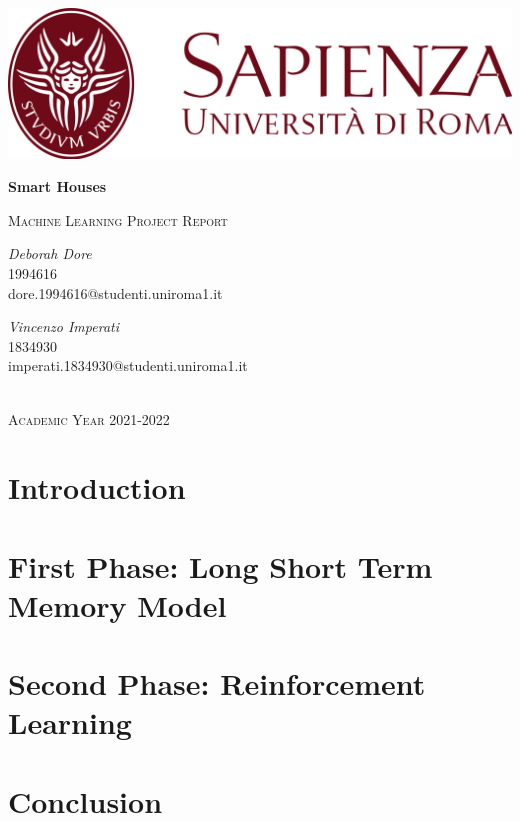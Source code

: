 \documentclass[12pt]{article}
\begin{document}
\begin{titlepage}
\thispagestyle{empty}
\center

\includegraphics[scale=0.2]{logo_uniroma1.png}\\[3cm]


{\Huge \bfseries Smart Houses
\par}\vspace{1cm}
\textsc{\Large Machine Learning Project Report}\\[4cm]

\begin{minipage}{\textwidth}
\begin{flushleft} \large
\textit{Deborah Dore}\\[0.3cm]
1994616 \\[0.2cm]
dore.1994616@studenti.uniroma1.it
\end{flushleft}
\end{minipage}

\begin{minipage}{\textwidth}
\begin{flushright} \large
\textit{Vincenzo Imperati}\\[0.3cm]
1834930\\[0.2cm]
imperati.1834930@studenti.uniroma1.it
\end{flushright}
\end{minipage}
\\[5cm]
\textsc{\large Academic Year 2021-2022}

\vfill %
\end{titlepage}

\newpage
\tableofcontents 

\newpage
\begin{abstract}
    
\end{abstract}

\newpage
\section{Introduction}


\newpage
\section{First Phase: Long Short Term Memory Model}


\newpage
\section{Second Phase: Reinforcement Learning}


\newpage
\section{Conclusion}



\newpage
\printbibliography[heading=bibintoc]
\end{document}
